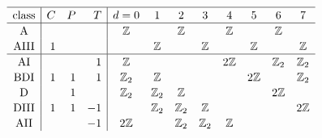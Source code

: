 \documentclass[letterpaper, 10 pt, conference]{ieeeconf}  %
\begin{document}
\newcommand\T{\rule{0pt}{1em}}

$$
\begin{array}{c|rrr|cccccccc}
\hline
\color{black}{\textrm{class}} & \color{black}{C} & \color{black}{P} & \color{black}{T} & \color{black}{d=0} & \color{black}{1} & \color{black}{2} & \color{black}{3} & \color{black}{4} & \color{black}{5} & \color{black}{6} & \color{black}{7}\T\\
\hline \color{black}{\textrm{A}} & \color{black}{} & \color{black}{} & \color{black}{} & \color{black}{\mathbb{Z}} & \color{black}{} & \color{black}{\mathbb{Z}} & \color{black}{} & \color{black}{\mathbb{Z}} & \color{black}{} & \color{black}{\mathbb{Z}} & \color{black}{}\T\\
\color{black}{\textrm{AIII}} & \color{black}{1} & \color{black}{} & \color{black}{} & \color{black}{} & \color{black}{\mathbb{Z}} & \color{black}{} & \color{black}{\mathbb{Z}} & \color{black}{} & \color{black}{\mathbb{Z}} & \color{black}{} & \color{black}{\mathbb{Z}}\T\\
\hline \color{black}{\textrm{AI}} & \color{black}{} & \color{black}{} & \color{black}{1} & \color{black}{\mathbb{Z}} & \color{black}{} & \color{black}{} & \color{black}{} & \color{black}{2\mathbb{Z}} & \color{black}{} & \color{black}{\mathbb{Z}_2} & \color{black}{\mathbb{Z}_2}\T\\
\color{black}{\textrm{BDI}} & \color{black}{1} & \color{black}{1} & \color{black}{1} & \color{black}{\mathbb{Z}_2} & \color{black}{\mathbb{Z}} & \color{black}{} & \color{black}{} & \color{black}{} & \color{black}{2\mathbb{Z}} & \color{black}{} & \color{black}{\mathbb{Z}_2}\T\\
\color{black}{\textrm{D}} & \color{black}{} & \color{black}{1} & \color{black}{} & \color{black}{\mathbb{Z}_2} & \color{black}{\mathbb{Z}_2} & \color{black}{\mathbb{Z}} & \color{black}{} & \color{black}{} & \color{black}{} & \color{black}{2\mathbb{Z}} & \color{black}{}\T\\
\color{black}{\textrm{DIII}} & \color{black}{1} & \color{black}{1} & \color{black}{-1} & \color{black}{} & \color{black}{\mathbb{Z}_2} & \color{black}{\mathbb{Z}_2} & \color{black}{\mathbb{Z}} & \color{black}{} & \color{black}{} & \color{black}{} & \color{black}{2\mathbb{Z}}\T\\
\color{black}{\textrm{AII}} & \color{black}{} & \color{black}{} & \color{black}{-1} & \color{black}{2\mathbb{Z}} & \color{black}{} & \color{black}{\mathbb{Z}_2} & \color{black}{\mathbb{Z}_2} & \color{black}{\mathbb{Z}} & \color{black}{} & \color{black}{} & \color{black}{}\T\\

\end{array}$$
\end{document}
